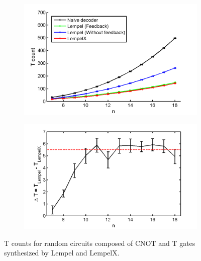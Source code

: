 \documentclass{article}
\theoremstyle{definition}
\theoremstyle{problem}
\theoremstyle{lemma}
\begin{document}
				\begin{figure}					
					\centering
					\begin{subfigure}[h]{0.55\textwidth}
						\includegraphics[width=\textwidth]{LX_vs_Lempel}
						\caption{}
						\label{f_random_a}
					\end{subfigure}
					\begin{subfigure}[h]{0.44\textwidth}
						\includegraphics[width=\textwidth]{DeltaT}
						\caption{}
						\label{f_random_b}
					\end{subfigure}
					\caption{T counts for random circuits composed of CNOT and T gates synthesized by Lempel and LempelX.}
					\label{f_random}
				\end{figure}
				
\end{document}
